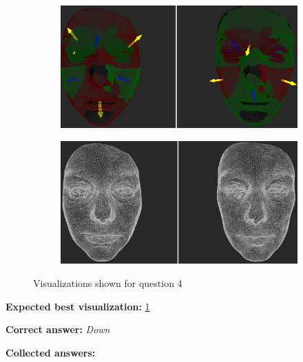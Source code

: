 \begin{figure}[h]
\begin{subfigure}{0.49\textwidth}
\includegraphics[width=\textwidth]{./img-study/pair9.PNG}
\caption{}
\label{fig:study-3-9}
\end{subfigure}
\begin{subfigure}{0.49\textwidth}
\includegraphics[width=\textwidth]{./img-study/pair6.PNG}
\caption{}
\label{fig:study-3-6}
\end{subfigure}
\caption{Visualizations shown for question 4}
\end{figure}
\medskip

{\bf Expected best visualization:} \ref{fig:study-3-9}
\medskip

{\bf Correct answer:} {\it Down}
\medskip

{\bf Collected answers:}

